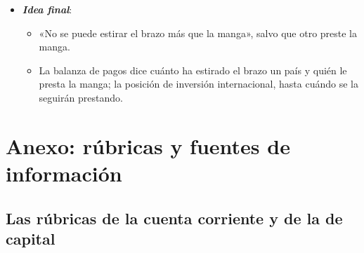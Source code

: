 \documentclass[11pt]{article}
\begin{document}
\begin{itemize}
\begin{itemize}
  \end{itemize}
\item \textbf{\emph{Idea final}}:
  \begin{itemize}
  \item «No se puede estirar el brazo más que la manga», salvo que otro preste la manga.
  \item La balanza de pagos dice cuánto ha estirado el brazo un país y quién le presta la manga; la posición de inversión internacional, hasta cuándo se la seguirán prestando.
  \end{itemize}
\end{itemize}


\clearpage
\appendix

\section{Anexo: rúbricas y fuentes de información}\label{anexo:rubricas}

\subsection*{Las rúbricas de la cuenta corriente y de la de capital}
\end{document}
